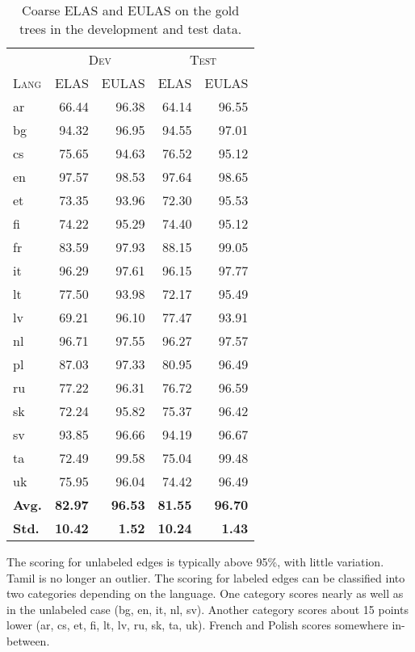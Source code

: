 \documentclass[11pt,a4paper]{article}
\begin{document}
\begin{table}[ht]
	\centering
    \small
	\begin{tabular}{l|rrrr}
        & \multicolumn{2}{c}{\textsc{Dev}} & \multicolumn{2}{c}{\textsc{Test}} \\
		\textsc{Lang} & \textsc{ELAS} & \textsc{EULAS} & \textsc{ELAS} & \textsc{EULAS} \\
		\hline 
		ar & 66.44 & 96.38 & 64.14 & 96.55 \\
		bg & 94.32 & 96.95 & 94.55 & 97.01 \\
		cs & 75.65 & 94.63 & 76.52 & 95.12 \\
		en & 97.57 & 98.53 & 97.64 & 98.65 \\
		et & 73.35 & 93.96 & 72.30 & 95.53 \\
		fi & 74.22 & 95.29 & 74.40 & 95.12 \\
		fr & 83.59 & 97.93 & 88.15 & 99.05 \\
		it & 96.29 & 97.61 & 96.15 & 97.77 \\
		lt & 77.50 & 93.98 & 72.17 & 95.49 \\
		lv & 69.21 & 96.10 & 77.47 & 93.91 \\
		nl & 96.71 & 97.55 & 96.27 & 97.57 \\
		pl & 87.03 & 97.33 & 80.95 & 96.49 \\
		ru & 77.22 & 96.31 & 76.72 & 96.59 \\
		sk & 72.24 & 95.82 & 75.37 & 96.42 \\
		sv & 93.85 & 96.66 & 94.19 & 96.67 \\
		ta & 72.49 & 99.58 & 75.04 & 99.48 \\
		uk & 75.95 & 96.04 & 74.42 & 96.49 \\
		\textbf{Avg.} & \textbf{82.97}  & \textbf{96.53}& \textbf{81.55} & \textbf{96.70} \\
        \textbf{Std.} & \textbf{10.42} & \textbf{1.52} & \textbf{10.24} & \textbf{1.43} \\
	\end{tabular}
	\caption{\label{tab:gold-data}Coarse ELAS and EULAS on the gold trees in the development and test data.}
\end{table} 

The scoring for unlabeled edges is typically above 95\%, with little
variation. Tamil is no longer an outlier. The scoring for labeled
edges can be classified into two categories depending on the
language. One category scores nearly as well as in the unlabeled case
(bg, en, it, nl, sv). Another category scores about 15 points
lower (ar, cs, et, fi, lt, lv, ru, sk, ta, uk). French and Polish scores
somewhere in-between. 
\end{document}
